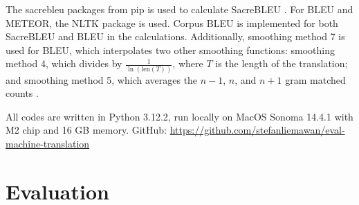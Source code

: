 \documentclass[a4paper]{article}
\begin{document}
The sacrebleu packages from pip is used to calculate SacreBLEU \cite{post-2018-sacrebleu}. For BLEU and METEOR, the NLTK \cite{bird-2009-natural} package is used. Corpus BLEU is implemented for both SacreBLEU and BLEU in the calculations. Additionally, smoothing method 7 is used for BLEU, which interpolates two other smoothing functions: smoothing method 4, which divides by \( \frac{1}{\ln(\text{len}(T))} \), where \( T \) is the length of the translation; and smoothing method 5, which averages the \( n-1 \), \( n \), and \( n+1 \) gram matched counts \cite{nltk-bleu-docs}.

All codes are written in Python 3.12.2, run locally on MacOS Sonoma 14.4.1 with M2 chip and 16 GB memory. GitHub: \url{https://github.com/stefanliemawan/eval-machine-translation}

\section{Evaluation}
\end{document}

